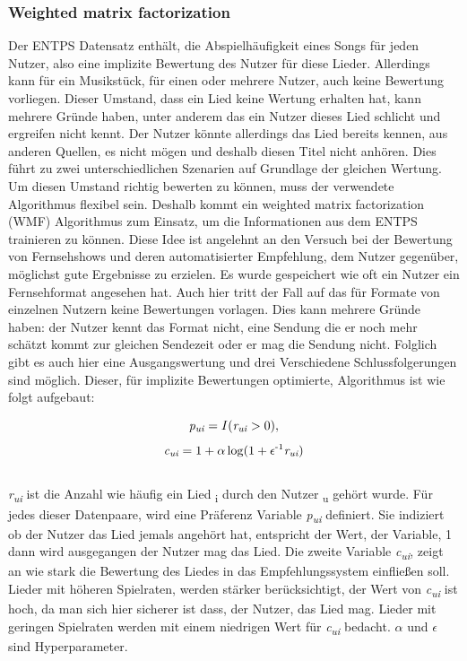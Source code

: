 \documentclass[twosided,a4,10pt]{article}
\begin{document}
\begin{multicols}{2}
		\subsubsection{Weighted matrix factorization}
		Der ENTPS Datensatz enthält, die Abspielhäufigkeit eines Songs für jeden Nutzer, also eine implizite Bewertung des Nutzer für diese Lieder. Allerdings kann für ein Musikstück, für einen oder mehrere Nutzer, auch keine Bewertung vorliegen. Dieser Umstand, dass ein Lied keine Wertung erhalten hat, kann mehrere Gründe haben, unter anderem das ein Nutzer dieses Lied schlicht und ergreifen nicht kennt. Der Nutzer könnte allerdings das Lied bereits kennen, aus anderen Quellen, es nicht mögen und deshalb diesen Titel nicht anhören. Dies führt zu zwei unterschiedlichen Szenarien auf Grundlage der gleichen Wertung. Um diesen Umstand richtig bewerten zu können, muss der verwendete Algorithmus flexibel sein. Deshalb kommt ein weighted matrix factorization (WMF) Algorithmus zum Einsatz, um die Informationen aus dem ENTPS trainieren zu können. \cite{oord} Diese Idee ist angelehnt an den Versuch bei der Bewertung von Fernsehshows und deren automatisierter Empfehlung, dem Nutzer gegenüber, möglichst gute Ergebnisse zu erzielen. Es wurde gespeichert wie oft ein Nutzer ein Fernsehformat angesehen hat. Auch hier tritt der Fall auf das für Formate von einzelnen Nutzern keine Bewertungen vorlagen. Dies kann mehrere Gründe haben: der Nutzer kennt das Format nicht, eine Sendung die er noch mehr schätzt kommt zur gleichen Sendezeit oder er mag die Sendung nicht. Folglich gibt es auch hier eine Ausgangswertung und drei Verschiedene Schlussfolgerungen sind möglich. \cite{CollaborativeTVShow}\newline
		Dieser, für implizite Bewertungen optimierte, Algorithmus ist wie folgt aufgebaut:
		
		\begin{equation*}
		\textit{p\textsubscript{ui}} = I(\textit{r\textsubscript{ui}} > 0),
		\end{equation*}
		\begin{equation*}
		\textit{c\textsubscript{ui}} = 1 + \alpha \log (1 + \epsilon\textsuperscript{-1} \textit{r\textsubscript{ui}})
		\end{equation*}\newline\\
		\textit{r\textsubscript{ui}} ist die Anzahl wie häufig ein Lied \textsubscript{i} durch den Nutzer \textsubscript{u} gehört wurde. Für jedes dieser Datenpaare, wird eine Präferenz Variable \textit{p\textsubscript{ui}} definiert. Sie indiziert ob der Nutzer das Lied jemals angehört hat, entspricht der Wert, der Variable, 1 dann wird ausgegangen der Nutzer mag das Lied. Die zweite Variable \textit{c\textsubscript{ui}}, zeigt an wie stark die Bewertung des Liedes in das Empfehlungssystem einfließen soll. Lieder mit höheren Spielraten, werden stärker berücksichtigt, der Wert von \textit{c\textsubscript{ui}} ist hoch, da man sich hier sicherer ist dass, der Nutzer, das Lied mag. Lieder mit geringen Spielraten werden mit einem niedrigen Wert für \textit{c\textsubscript{ui}} bedacht.
		$\alpha$ und $\epsilon$ sind Hyperparameter.
		

\end{multicols}
\end{document}
